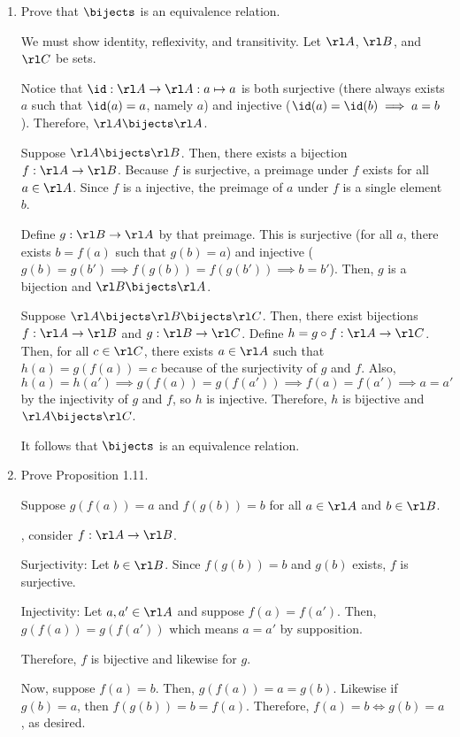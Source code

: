 \documentclass[class=math239,notes,tikz]{agony}
\begin{document}
\begin{xca}\end{xca}
\begin{enumerate}
  \item Prove that $\bijects$ is an equivalence relation.
        \begin{prf}
          We must show identity, reflexivity, and transitivity.
          Let $\rl A$, $\rl B$, and $\rl C$ be sets.

          Notice that $\id : \rl A \to \rl A : a \mapsto a$
          is both surjective (there always exists $a$ such that $\id(a) = a$, namely $a$)
          and injective ($\id(a) = \id(b) \implies a = b$).
          Therefore, $\rl A \bijects \rl A$.

          Suppose $\rl A \bijects \rl B$.
          Then, there exists a bijection $f : \rl A \to \rl B$.
          Because $f$ is surjective, a preimage under $f$ exists for all $a \in \rl A$.
          Since $f$ is a injective, the preimage of $a$ under $f$ is a single element $b$.

          Define $g : \rl B \to \rl A$ by that preimage.
          This is surjective (for all $a$, there exists $b = f(a)$ such that $g(b) = a$)
          and injective ($g(b) = g(b') \implies f(g(b)) = f(g(b')) \implies b = b'$).
          Then, $g$ is a bijection and $\rl B \bijects \rl A$.

          Suppose $\rl A \bijects \rl B \bijects \rl C$.
          Then, there exist bijections $f : \rl A \to \rl B$ and $g : \rl B \to \rl C$.
          Define $h = g \circ f : \rl A \to \rl C$.
          Then, for all $c \in \rl C$, there exists $a \in \rl A$
          such that $h(a) = g(f(a)) = c$ because of the surjectivity of $g$ and $f$.
          Also, $h(a) = h(a') \implies g(f(a)) = g(f(a')) \implies f(a) = f(a') \implies a = a'$
          by the injectivity of $g$ and $f$, so $h$ is injective.
          Therefore, $h$ is bijective and $\rl A \bijects \rl C$.

          It follows that $\bijects$ is an equivalence relation.
        \end{prf}
  \item Prove Proposition 1.11.
        \begin{prf}
          Suppose $g(f(a)) = a$ and $f(g(b)) = b$ for all $a \in \rl A$ and $b \in \rl B$.

          \WLOG, consider $f : \rl A \to \rl B$.

          Surjectivity: Let $b \in \rl B$.
          Since $f(g(b)) = b$ and $g(b)$ exists, $f$ is surjective.

          Injectivity: Let $a, a' \in \rl A$ and suppose $f(a) = f(a')$.
          Then, $g(f(a)) = g(f(a'))$ which means $a = a'$ by supposition.

          Therefore, $f$ is bijective and likewise for $g$.

          Now, suppose $f(a) = b$. Then, $g(f(a)) = a = g(b)$.
          Likewise if $g(b) = a$, then $f(g(b)) = b = f(a)$.
          Therefore, $f(a) = b \iff g(b) = a$, as desired.
        \end{prf}
\end{enumerate}
\end{document}

